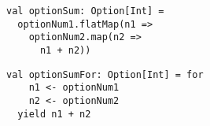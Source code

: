 \begin{algorithm}

\begin{minipage}{0.40\textwidth}
\begin{verbatim}
val optionSum: Option[Int] =
  optionNum1.flatMap(n1 =>
    optionNum2.map(n2 =>
      n1 + n2))
\end{verbatim}
\end{minipage}
%
\hspace{0.05\textwidth}
%
\begin{minipage}{0.40\textwidth}
\begin{verbatim}
val optionSumFor: Option[Int] = for
    n1 <- optionNum1
    n2 <- optionNum2
  yield n1 + n2
\end{verbatim}
\end{minipage}

\caption{For-comprehension in Scala %
\label{monad:for-syntax}}
\end{algorithm}
